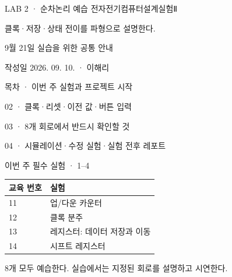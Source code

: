 
\renewcommand{\legacySource}[1]{}
\newcommand{\terminalbox}[1]{\par\vspace{0.15cm}{\setlength{\fboxsep}{7pt}\colorbox{black}{\parbox{\dimexpr\textwidth-14pt\relax}{\color{white}\ttfamily\fontsize{7}{9}\selectfont #1}}}\par\vspace{0.15cm}}

\renewcommand{\small}{\fontsize{9}{12}\selectfont}
\setlength{\leftmargini}{1.4em}
\begin{frame}{LAB 2 · 순차논리 예습}
\small
전자전기컴퓨터설계실험Ⅱ\par\vspace{0.26cm}클록·저장·상태 전이를 파형으로 설명한다.\par\vspace{0.26cm}9월 21일 실습을 위한 공통 안내\par\vspace{0.26cm}작성일 2026. 09. 10. · 이해리\par
\end{frame}

\begin{frame}[label=lab2-contents]{목차}
\small
01 · 이번 주 실험과 프로젝트 시작\par\vspace{0.26cm}02 · 클록·리셋·이전 값·버튼 입력\par\vspace{0.26cm}03 · 8개 회로에서 반드시 확인할 것\par\vspace{0.26cm}04 · 시뮬레이션·수정 실험·실험 전후 레포트\par\vspace{0.2cm}\quad{}\quad{}\quad{}
\end{frame}

\begin{frame}[label=circuits]{이번 주 필수 실험 · 1–4}
\small
\begin{center}\renewcommand{\arraystretch}{1.55}\begin{tabular}{ll}
교육 번호 & 실험\\\hline
11 & 업/다운 카운터\\
12 & 클록 분주\\
13 & 레지스터: 데이터 저장과 이동\\
14 & 시프트 레지스터\\
\end{tabular}\end{center}8개 모두 예습한다. 실습에서는 지정된 회로를 설명하고 시연한다.\par
\end{frame}

